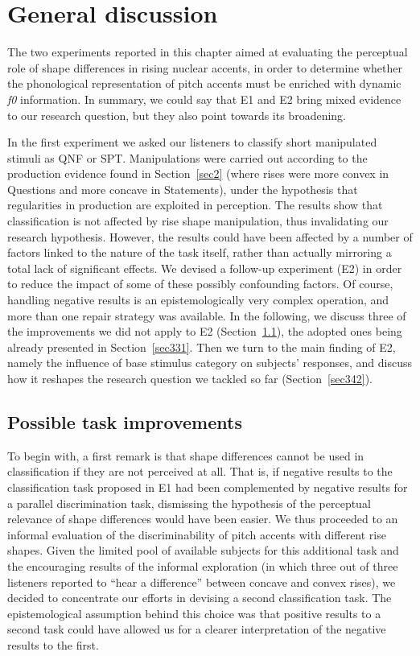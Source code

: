\section{General discussion}\label{sec34}
The two experiments reported in this chapter aimed at evaluating the perceptual role of shape differences in rising nuclear accents, in order to determine whether the phonological representation of pitch accents must be enriched with dynamic \textit{f0} information. In summary, we could say that E1 and E2 bring mixed evidence to our research question, but they also point towards its broadening. 

In the first experiment we asked our listeners to classify short manipulated stimuli as QNF or SPT. Manipulations were carried out according to the production evidence found in Section~\ref{sec2} (where rises were more convex in Questions and more concave in Statements), under the hypothesis that regularities in production are exploited in perception. The results show that classification is not affected by rise shape manipulation, thus invalidating our research hypothesis. However, the results could have been affected by a number of factors linked to the nature of the task itself, rather than actually mirroring a total lack of significant effects. We devised a follow-up experiment (E2) in order to reduce the impact of some of these possibly confounding factors. Of course, handling negative results is an epistemologically very complex operation, and more than one repair strategy was available. In the following, we discuss three of the improvements we did not apply to E2 (Section~\ref{sec341}), the adopted ones being already presented in Section~\ref{sec331}. Then we turn to the main finding of E2, namely the influence of base stimulus category on subjects' responses, and discuss how it reshapes the research question we tackled so far (Section~\ref{sec342}).

\subsection{Possible task improvements}\label{sec341}
To begin with, a first remark is that shape differences cannot be used in classification if they are not perceived at all. That is, if negative results to the classification task proposed in E1 had been complemented by negative results for a parallel discrimination task, dismissing the hypothesis of the perceptual relevance of shape differences would have been easier. We thus proceeded to an informal evaluation of the discriminability of pitch accents with different rise shapes. Given the limited pool of available subjects for this additional task and the encouraging results of the informal exploration (in which three out of three listeners reported to ``hear a difference'' between concave and convex rises), we decided to concentrate our efforts in devising a second classification task. The epistemological assumption behind this choice was that positive results to a second task could have allowed us for a clearer interpretation of the negative results to the first.

